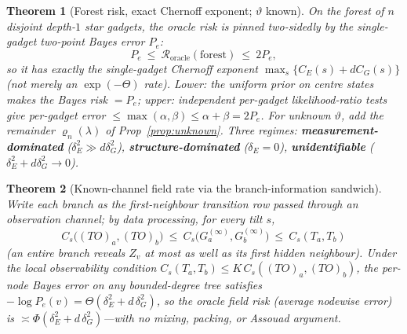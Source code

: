\documentclass[11pt]{article}
\newtheorem{theorem}{Theorem}
\begin{document}
\begin{theorem}[Forest risk, exact Chernoff exponent; $\vartheta$ known]\label{thm:forest}
On the \emph{forest} of $n$ disjoint depth-$1$ star gadgets, the oracle risk is pinned two-sidedly by the
single-gadget two-point Bayes error $P_e$:
\[
   P_e\ \le\ \mathcal R_{\mathrm{oracle}}(\mathrm{forest})\ \le\ 2P_e,
\]
so it has \emph{exactly} the single-gadget Chernoff exponent $\max_s\{C_E(s)+dC_G(s)\}$ (not merely an
$\exp(-\Theta)$ rate). \emph{Lower:} the uniform prior on centre states makes the Bayes risk $=P_e$;
\emph{upper:} independent per-gadget likelihood-ratio tests give per-gadget error $\le\max(\alpha,\beta)\le
\alpha+\beta=2P_e$. For \emph{unknown} $\vartheta$, add the remainder $\varrho_n(\lambda)$ of
Prop~\ref{prop:unknown}. Three regimes: \textbf{measurement-dominated} ($\delta_E^2\gg d\delta_G^2$),
\textbf{structure-dominated} ($\delta_E{=}0$), \textbf{unidentifiable} ($\delta_E^2+d\delta_G^2\to0$).
\end{theorem}
\begin{theorem}[Known-channel field rate via the branch-information sandwich]\label{thm:connected}
Write each branch as the first-neighbour transition row passed through an observation channel; by data processing,
for every tilt $s$,
\[
   C_s\big((TO)_a,(TO)_b\big)\ \le\ C_s\big(G_a^{(\infty)},G_b^{(\infty)}\big)\ \le\ C_s(T_a,T_b)
\]
(an entire branch reveals $Z_v$ at most as well as its first hidden neighbour). Under the local observability
condition $C_s(T_a,T_b)\le K\,C_s((TO)_a,(TO)_b)$, the per-node Bayes error on \emph{any} bounded-degree tree
satisfies $-\log P_e(v)=\Theta(\delta_E^2+d\,\delta_G^2)$, so the oracle field risk (average nodewise error) is
$\asymp\Phi(\delta_E^2+d\,\delta_G^2)$---with no mixing, packing, or Assouad argument.
\end{theorem}
\end{document}

